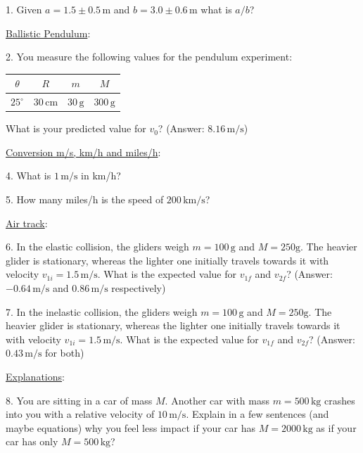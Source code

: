 1. Given $a = 1.5 \pm 0.5\, \textrm{m}$ and $b = 3.0 \pm 0.6\, \textrm{m}$ what is $a/b$?\myskip

\noindent\underline{Ballistic Pendulum}:\myskip

2. You measure the following values for the pendulum experiment:
\begin{table}[h]
  \centering
  \begin{tabular}{|c|c|c|c|}
    \hline
    $\theta$&$R$&$m$&$M$\\
    \hline
    $25^\circ$ & $30\,\mathrm{cm}$ & $30\,\textrm{g}$ & $300\,\textrm{g}$\\
    \hline
  \end{tabular}
\end{table}

What is your predicted value for $v_0$? (Answer: $8.16\,\mathrm{m/s}$)\myskip

\noindent\underline{Conversion m/s, km/h and miles/h}: \myskip

4. What is $1\, \textrm{m/s}$ in km/h?\myskip

5. How many miles/h is the speed of $200\,\textrm{km/s}$?\myskip


\noindent\underline{Air track}:\myskip

6. In the elastic collision, the gliders weigh $m = 100\,\textrm{g}$ and $M = 250\textrm{g}$. The heavier glider is stationary, whereas the lighter one initially travels towards it with velocity $v_{1i} = 1.5\,\mathrm{m/s}$. What is the expected value for $v_{1f}$ and $v_{2f}$? (Answer: $-0.64\,\mathrm{m/s}$ and $0.86\,\mathrm{m/s}$ respectively)\myskip

7. In the inelastic collision, the gliders weigh $m = 100\,\textrm{g}$ and $M = 250\textrm{g}$. The heavier glider is stationary, whereas the lighter one initially travels towards it with velocity $v_{1i} = 1.5\,\mathrm{m/s}$. What is the expected value for $v_{1f}$ and $v_{2f}$? (Answer: $0.43\,\mathrm{m/s}$ for both)\myskip

\noindent\underline{Explanations}:\myskip

8. You are sitting in a car of mass $M$. Another car with mass $m = 500\,\textrm{kg}$ crashes into you with a relative velocity of $10\,\textrm{m/s}$. Explain in a few sentences (and maybe equations) why you feel less impact if your car has $M = 2000\,\textrm{kg}$ as if your car has only $M = 500\,\textrm{kg}$? 

